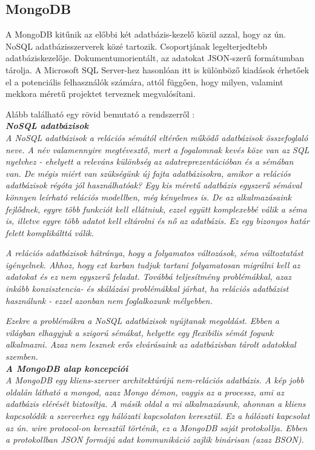 \subsection{MongoDB}

A MongoDB kitűnik az előbbi két adatbázis-kezelő közül azzal, hogy az ún. NoSQL adatbázisszerverek közé tartozik. Csoportjának legelterjedtebb adatbáziskezelője. Dokumentumorientált, az adatokat JSON-szerű formátumban tárolja. 
A Microsoft SQL Server-hez hasonlóan itt is különböző kiadások érhetőek el a potenciális felhasználók számára, attól függően, hogy milyen, valamint mekkora méretű projektet terveznek megvalósítani.

Alább található egy rövid bemutató a rendszerről \cite{mongodbcikk}:\\

\noindent\textit{\textbf{\large{NoSQL adatbázisok}}}\\

\textit{A NoSQL adatbázisok a relációs sémától eltérően működő adatbázisok összefoglaló neve. A név valamennyire megtévesztő, mert a fogalomnak kevés köze van az SQL nyelvhez - ehelyett a releváns különbség az adatreprezentációban és a sémában van. De mégis miért van szükségünk új fajta adatbázisokra, amikor a relációs adatbázisok régóta jól használhatóak? Egy kis méretű adatbázis egyszerű sémával könnyen leírható relációs modellben, még kényelmes is. De az alkalmazásaink fejlődnek, egyre több funkciót kell ellátniuk, ezzel együtt komplexebbé válik a séma is, illetve egyre több adatot kell eltárolni és nő az adatbázis. Ez egy bizonyos határ felett komplikálttá válik.}

\textit{A relációs adatbázisok hátránya, hogy a folyamatos változások, séma változtatást igényelnek. Ahhoz, hogy ezt karban tudjuk tartani folyamatosan migrálni kell az adatokat és ez nem egyszerű feladat. Továbbá teljesítmény problémákkal, azaz inkább konzisztencia- és skálázási problémákkal járhat, ha relációs adatbázist használunk - ezzel azonban nem foglalkozunk mélyebben.}

\textit{Ezekre a problémákra a NoSQL adatbázisok nyújtanak megoldást. Ebben a világban elhagyjuk a szigorú sémákat, helyette egy flexibilis sémát fogunk alkalmazni. Azaz nem lesznek erős elvárásaink az adatbázisban tárolt adatokkal szemben.}\\

\noindent\textit{\textbf{A MongoDB alap koncepciói}}\\

\textit{A MongoDB egy kliens-szerver architektúrájú nem-relációs adatbázis. A kép jobb oldalán látható a mongod, azaz Mongo démon, vagyis az a processz, ami az adatbázis elérését biztosítja. A másik oldal a mi alkalmazásunk, ahonnan a kliens kapcsolódik a szerverhez egy hálózati kapcsolaton keresztül. Ez a hálózati kapcsolat az ún. wire protocol-on keresztül történik, ez a MongoDB saját protokollja. Ebben a protokollban JSON formájú adat kommunikáció zajlik binárisan (azaz BSON).}\\

